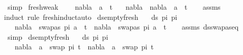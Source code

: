 \begin{isabellebody}
\ simp%
\endisatagproof
{\isafoldproof}%
%
\isadelimproof
\isanewline
%
\endisadelimproof
\isanewline
{}\isamarkupfalse%
\ fresh{\isacharunderscore}{\kern0pt}weak{\isacharcolon}{\kern0pt}\ \isanewline
\ \ \ {\isachardoublequoteopen}nabla{}\ {\isasymturnstile}\ a\ {\isasymsharp}\ t{\isachardoublequoteclose}\isanewline
\ \ \ {\isachardoublequoteopen}{\isacharparenleft}{\kern0pt}nabla{}\ {\isasymunion}\ nabla{}{\isacharparenright}{\kern0pt}\ {\isasymturnstile}\ a\ {\isasymsharp}\ t{\isachardoublequoteclose}\isanewline
%
\isadelimproof
\ \ %
\endisadelimproof
%
\isatagproof
{}\isamarkupfalse%
\ assms\isanewline
\ \ \isamarkupfalse%
{\isacharparenleft}{\kern0pt}induct\ rule{\isacharcolon}{\kern0pt}\ fresh{\isachardot}{\kern0pt}induct{\isacharparenright}{\kern0pt}{\isacharparenleft}{\kern0pt}auto{\isacharparenright}{\kern0pt}%
\endisatagproof
{\isafoldproof}%
%
\isadelimproof
\isanewline
%
\endisadelimproof
\isanewline
{}\isamarkupfalse%
\ ds{\isacharunderscore}{\kern0pt}empty{\isacharunderscore}{\kern0pt}fresh{\isacharunderscore}{\kern0pt}{}{\isacharcolon}{\kern0pt}\isanewline
\ \ \ {\isachardoublequoteopen}ds\ pi{}\ pi{}\ {\isacharequal}{\kern0pt}\ {\isacharbraceleft}{\kern0pt}{\isacharbraceright}{\kern0pt}{\isachardoublequoteclose}\isanewline
\ \ \ {\isachardoublequoteopen}nabla\ {\isasymturnstile}\ swapas\ pi{}\ a\ {\isasymsharp}\ t\ {\isasymLongrightarrow}\ nabla\ {\isasymturnstile}\ swapas\ pi{}\ a\ {\isasymsharp}\ t{\isachardoublequoteclose}\isanewline
%
\isadelimproof
\ \ %
\endisadelimproof
%
\isatagproof
{}\isamarkupfalse%
\ assms\ ds{\isacharunderscore}{\kern0pt}swapas{\isacharunderscore}{\kern0pt}eq\ \isamarkupfalse%
\ simp%
\endisatagproof
{\isafoldproof}%
%
\isadelimproof
\isanewline
%
\endisadelimproof
\isanewline
{}\isamarkupfalse%
\ ds{\isacharunderscore}{\kern0pt}empty{\isacharunderscore}{\kern0pt}fresh{\isacharunderscore}{\kern0pt}{}{\isacharcolon}{\kern0pt}\isanewline
\ \ \ {\isachardoublequoteopen}ds\ pi{}\ pi{}\ {\isacharequal}{\kern0pt}\ {\isacharbraceleft}{\kern0pt}{\isacharbraceright}{\kern0pt}{\isachardoublequoteclose}\isanewline
\ \ \ {\isachardoublequoteopen}nabla\ {\isasymturnstile}\ a\ {\isasymsharp}\ swap\ pi{}\ t\ {\isasymLongrightarrow}\ nabla\ {\isasymturnstile}\ a\ {\isasymsharp}\ swap\ pi{}\ t{\isachardoublequoteclose}\isanewline

\end{isabellebody}
